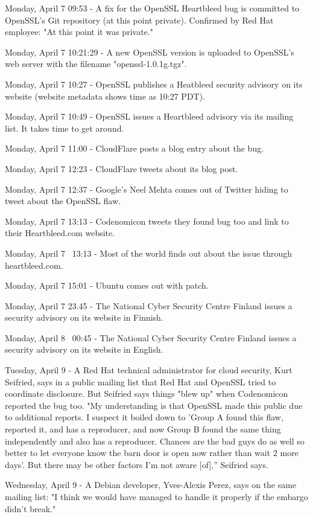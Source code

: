 Monday, April 7 09:53 - A fix for the OpenSSL Heartbleed bug is committed to OpenSSL's Git repository (at this point private). Confirmed by Red Hat employee: "At this point it was private."

Monday, April 7 10:21:29 - A new OpenSSL version is uploaded to OpenSSL's web server with the filename "openssl-1.0.1g.tgz".

Monday, April 7 10:27 - OpenSSL publishes a Heatbleed security advisory on its website (website metadata shows time as 10:27 PDT).

Monday, April 7 10:49 - OpenSSL issues a Heartbleed advisory via its mailing list. It takes time to get around.

Monday, April 7 11:00 - CloudFlare posts a blog entry about the bug.

Monday, April 7 12:23 - CloudFlare tweets about its blog post.

Monday, April 7 12:37 - Google's Neel Mehta comes out of Twitter hiding to tweet about the OpenSSL flaw.

Monday, April 7 13:13 - Codenomicon tweets they found bug too and link to their Heartbleed.com website.

Monday, April 7 ~13:13 - Most of the world finds out about the issue through heartbleed.com.

Monday, April 7 15:01 - Ubuntu comes out with patch.

Monday, April 7 23.45 - The National Cyber Security Centre Finland issues a security advisory on its website in Finnish.

Monday, April 8 ~00:45 - The National Cyber Security Centre Finland issues a security advisory on its website in English.

Tuesday, April 9 - A Red Hat technical administrator for cloud security, Kurt Seifried, says in a public mailing list that Red Hat and OpenSSL tried to coordinate disclosure. But Seifried says things "blew up" when Codenomicon reported the bug too. "My understanding is that OpenSSL made this public due to additional reports. I suspect it boiled down to 'Group A found this flaw, reported it, and has a reproducer, and now Group B found the same thing independently and also has a reproducer. Chances are the bad guys do as well so better to let everyone know the barn door is open now rather than wait 2 more days'. But there may be other factors I'm not aware [of],” Seifried says.

Wednesday, April 9 - A Debian developer, Yves-Alexis Perez, says on the same mailing list: "I think we would have managed to handle it properly if the embargo didn't break."

